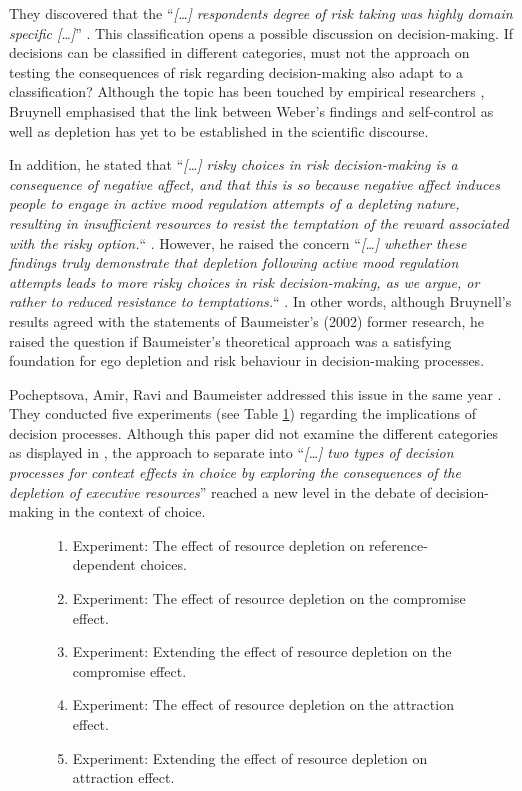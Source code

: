 They discovered that the “\emph{[\ldots] respondents degree of risk taking was highly domain specific [\ldots]}” \citep[p.~263]{weber2002domain}. This classification opens a possible discussion on decision-making. If decisions can be classified in different categories, must not the approach on testing the consequences of risk regarding decision-making also adapt to a classification? Although the topic has been touched by empirical researchers \citep{ditto2006visceral}, Bruynell \citep{bruyneel2009felt} emphasised that the link between Weber’s findings and self-control as well as depletion has yet to be established in the scientific discourse.\par
In addition, he stated that “\emph{[\ldots] risky choices in risk decision-making is a consequence of negative affect, and that this is so because negative affect induces people to engage in active mood regulation attempts of a depleting nature, resulting in insufficient resources to resist the temptation of the reward associated with the risky option.}“ \citep[p.~165]{bruyneel2009felt}. However, he raised the concern “\emph{[\ldots] whether these findings truly demonstrate that depletion following active mood regulation attempts leads to more risky choices in risk decision-making, as we argue, or rather to reduced resistance to temptations.}“ \citep[p.~165]{bruyneel2009felt}. In other words, although Bruynell’s results agreed with the statements of Baumeister’s (2002) former research, he raised the question if Baumeister’s theoretical approach was a satisfying foundation for ego depletion and risk behaviour in decision-making processes.\par
Pocheptsova, Amir, Ravi and Baumeister addressed this issue in the same year \citep{pocheptsova2009deciding}. They conducted five experiments (see Table \ref{tab:fiveexp}) regarding the implications of decision processes. Although this paper did not examine the different categories as displayed in \citep{weber2002domain}, the approach to separate into “\emph{[\ldots] two types of decision processes for context effects in choice by exploring the consequences of the depletion of executive resources}” \citep{pocheptsova2009deciding} reached a new level in the debate of decision-making in the context of choice.
\begin{figure}[h!]
\begin{enumerate}
	\item Experiment: The effect of resource depletion on reference-dependent choices.
	\item Experiment: The effect of resource depletion on the compromise effect.
	\item Experiment: Extending the effect of resource depletion on the compromise effect.
	\item Experiment: The effect of resource depletion on the attraction effect.
	\item Experiment: Extending the effect of resource depletion on attraction effect.
\label{tab:fiveexp}
\end{enumerate}
\end{figure}
